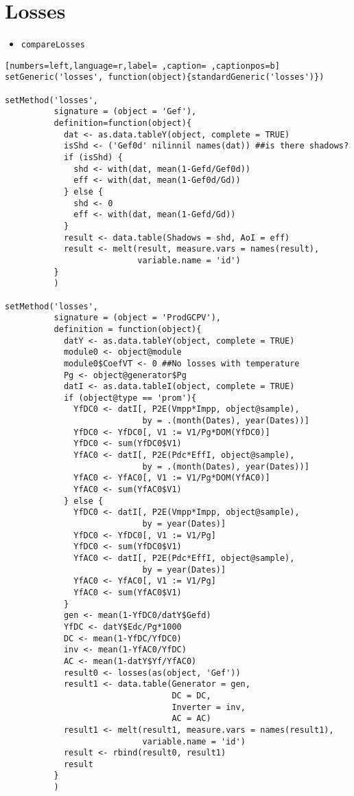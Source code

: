 \section{Losses}
\label{sec:org3544ad5}
\begin{itemize}
\item \texttt{compareLosses}
\end{itemize}
\begin{lstlisting}[numbers=left,language=r,label= ,caption= ,captionpos=b]
setGeneric('losses', function(object){standardGeneric('losses')})

setMethod('losses',
          signature = (object = 'Gef'),
          definition=function(object){
            dat <- as.data.tableY(object, complete = TRUE)
            isShd <- ('Gef0d' nilinnil names(dat)) ##is there shadows?
            if (isShd) {
              shd <- with(dat, mean(1-Gefd/Gef0d))
              eff <- with(dat, mean(1-Gef0d/Gd))
            } else {
              shd <- 0
              eff <- with(dat, mean(1-Gefd/Gd))
            }
            result <- data.table(Shadows = shd, AoI = eff)
            result <- melt(result, measure.vars = names(result),
                           variable.name = 'id')
          }
          )

setMethod('losses',
          signature = (object = 'ProdGCPV'),
          definition = function(object){
            datY <- as.data.tableY(object, complete = TRUE)
            module0 <- object@module
            module0$CoefVT <- 0 ##No losses with temperature
            Pg <- object@generator$Pg
            datI <- as.data.tableI(object, complete = TRUE)
            if (object@type == 'prom'){
              YfDC0 <- datI[, P2E(Vmpp*Impp, object@sample),
                            by = .(month(Dates), year(Dates))]
              YfDC0 <- YfDC0[, V1 := V1/Pg*DOM(YfDC0)]
              YfDC0 <- sum(YfDC0$V1)
              YfAC0 <- datI[, P2E(Pdc*EffI, object@sample),
                            by = .(month(Dates), year(Dates))]
              YfAC0 <- YfAC0[, V1 := V1/Pg*DOM(YfAC0)]
              YfAC0 <- sum(YfAC0$V1)
            } else {
              YfDC0 <- datI[, P2E(Vmpp*Impp, object@sample),
                            by = year(Dates)]
              YfDC0 <- YfDC0[, V1 := V1/Pg]
              YfDC0 <- sum(YfDC0$V1)
              YfAC0 <- datI[, P2E(Pdc*EffI, object@sample),
                            by = year(Dates)]
              YfAC0 <- YfAC0[, V1 := V1/Pg]
              YfAC0 <- sum(YfAC0$V1)
            }
            gen <- mean(1-YfDC0/datY$Gefd)
            YfDC <- datY$Edc/Pg*1000
            DC <- mean(1-YfDC/YfDC0)
            inv <- mean(1-YfAC0/YfDC)
            AC <- mean(1-datY$Yf/YfAC0)
            result0 <- losses(as(object, 'Gef'))
            result1 <- data.table(Generator = gen,
                                  DC = DC,
                                  Inverter = inv,
                                  AC = AC)
            result1 <- melt(result1, measure.vars = names(result1),
                            variable.name = 'id')
            result <- rbind(result0, result1)
            result
          }
          )

\end{lstlisting}
